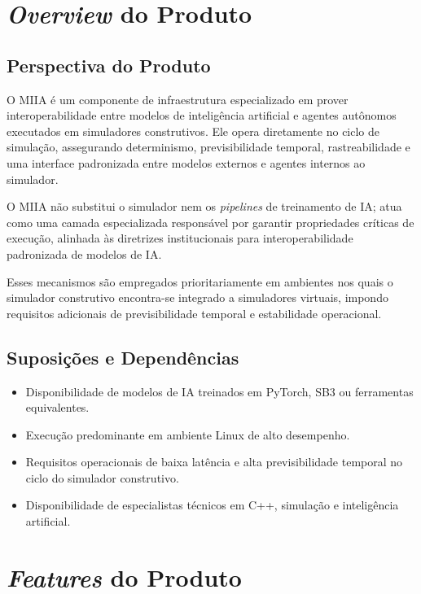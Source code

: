 \section{\emph{Overview} do Produto}

\subsection{Perspectiva do Produto}

O MIIA é um componente de infraestrutura especializado em prover interoperabilidade entre modelos de inteligência artificial e agentes autônomos executados em simuladores construtivos. Ele opera diretamente no ciclo de simulação, assegurando determinismo, previsibilidade temporal, rastreabilidade e uma interface padronizada entre modelos externos e agentes internos ao simulador.

O MIIA não substitui o simulador nem os \emph{pipelines} de treinamento de IA; atua como uma camada especializada responsável por garantir propriedades críticas de execução, alinhada às diretrizes institucionais para interoperabilidade padronizada de modelos de IA.

Esses mecanismos são empregados prioritariamente em ambientes nos quais o simulador construtivo encontra-se integrado a simuladores virtuais, impondo requisitos adicionais de previsibilidade temporal e estabilidade operacional.

\subsection{Suposições e Dependências}

\begin{itemize}
    \item Disponibilidade de modelos de IA treinados em PyTorch, SB3 ou ferramentas equivalentes.
    \item Execução predominante em ambiente Linux de alto desempenho.
    \item Requisitos operacionais de baixa latência e alta previsibilidade temporal no ciclo do simulador construtivo.
    \item Disponibilidade de especialistas técnicos em C++, simulação e inteligência artificial.
\end{itemize}

\section{\emph{Features} do Produto}

